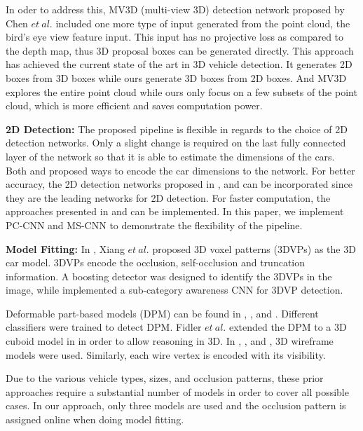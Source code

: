 \documentclass[letterpaper, 10 pt, conference]{ieeeconf}  \usepackage[
\begin{document}
In oder to address this, MV3D (multi-view 3D) detection network proposed by Chen $et~al.$ \cite{Chen2017CVPR} included one more type of input generated from the point cloud, the bird's eye view feature input. This input has no projective loss as compared to the depth map, thus 3D proposal boxes can be generated directly. This approach has achieved the current state of the art in 3D vehicle detection. It generates 2D boxes from 3D boxes while ours generate 3D boxes from 2D boxes. And MV3D explores the entire point cloud while ours only focus on a few subsets of the point cloud, which is more efficient and saves computation power.

\textbf{2D Detection:} The proposed pipeline is flexible in regards to the choice of 2D detection networks. Only a slight change is required on the last fully connected layer of the network so that it is able to estimate the dimensions of the cars. Both \cite{mousavian20163d} and \cite{deepmanta_cvpr17} proposed ways to encode the car dimensions to the network. For better accuracy, the 2D detection networks proposed in \cite{Ren17CVPR}, \cite{deepmanta_cvpr17} and \cite{yang2016exploit} can be incorporated since they are the leading networks for 2D detection. For faster computation, the approaches presented in \cite{redmon2017yolo9000} and \cite{liu2016ssd} can be implemented. In this paper, we implement PC-CNN \cite{du2017iros} and MS-CNN \cite{cai2016unified} to demonstrate the flexibility of the pipeline.

\textbf{Model Fitting:} In \cite{xiang2015data}, Xiang $et~al.$ proposed 3D voxel patterns (3DVPs) as the 3D car model. 3DVPs encode the occlusion, self-occlusion and truncation information. A boosting detector was designed to identify the 3DVPs in the image, while \cite{xiang2017subcategory} implemented a sub-category awareness CNN for 3DVP detection. 

Deformable part-based models (DPM) can be found in \cite{pepik2012teaching}, \cite{forsyth2014object}, \cite{yebes2014supervised} and \cite{pepik2015multi}. Different classifiers were trained to detect DPM. Fidler $et~al.$ extended the DPM to a 3D cuboid model in \cite{fidler20123d} in order to allow reasoning in 3D. In \cite{zeeshan2013explicit}, \cite{zia2013detailed}, \cite{zeeshan2014cars} and \cite{deepmanta_cvpr17}, 3D wireframe models were used. Similarly, each wire vertex is encoded with its visibility.  

Due to the various vehicle types, sizes, and occlusion patterns, these prior approaches require a substantial number of models in order to cover all possible cases. In our approach, only three models are used and the occlusion pattern is assigned online when doing model fitting.
\end{document}
